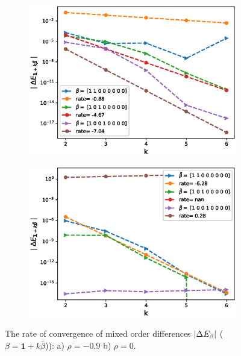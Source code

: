 \documentclass[11pt]{article}
\begin{document}
\begin{figure}[h!]
\centering
\begin{subfigure}{.5\textwidth}
\centering
\includegraphics[width=1\linewidth]{./figures/effect_rho_differences/H_0_43_K_0_8/N_4/mixed_difference_order2_rbergomi_4steps_H_043_K_0_8_rho__0_9_with_rate_W1}
\caption{}
\label{fig:sub3}
\end{subfigure}%
\begin{subfigure}{.5\textwidth}
\centering
\includegraphics[width=1\linewidth]{./figures/effect_rho_differences/H_0_43_K_0_8/N_4/mixed_difference_order2_rbergomi_4steps_H_043_K_0_8_rho_0_with_rate_W1}
\caption{}
\label{fig:sub4}
\end{subfigure}

\caption{The rate of convergence of  mixed order differences $\left\lvert\Delta E_{\beta}\right\rvert$ ($\beta=\mathbf{1}+k \bar{\beta}$)): a) $\rho=-0.9$ b)  $\rho=0.$}
\label{fig:test2}
\end{figure}
\end{document}
